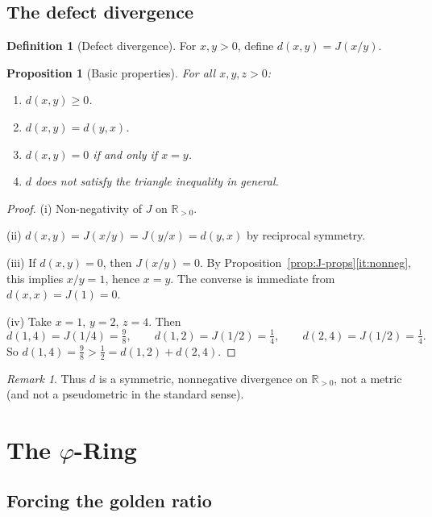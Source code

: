 \documentclass[11pt,a4paper]{article}
\theoremstyle{plain}
\newtheorem{proposition}[theorem]{Proposition}
\theoremstyle{definition}
\newtheorem{definition}[theorem]{Definition}
\theoremstyle{remark}
\newtheorem{remark}[theorem]{Remark}
\newcommand{\phig}{\varphi}
\newcommand{\Jcost}{J}
\newcommand{\RR}{\mathbb{R}}
\begin{document}
\subsection{The defect divergence}\label{ssec:metric}

\begin{definition}[Defect divergence]\label{def:defect-dist}
For $x,y>0$, define $d(x,y)=\Jcost(x/y)$.
\end{definition}

\begin{proposition}[Basic properties]\label{prop:metric}
For all $x,y,z>0$:
\begin{enumerate}[nosep,label=\textup{(\roman*)}]
\item $d(x,y)\ge0$.
\item $d(x,y)=d(y,x)$.
\item $d(x,y)=0$ if and only if $x=y$.
\item $d$ does not satisfy the triangle inequality in general.
\end{enumerate}
\end{proposition}

\begin{proof}
(i) Non-negativity of $\Jcost$ on $\RR_{>0}$.

(ii) $d(x,y)=\Jcost(x/y)=\Jcost(y/x)=d(y,x)$ by reciprocal symmetry.

(iii) If $d(x,y)=0$, then $\Jcost(x/y)=0$.
By Proposition~\ref{prop:J-props}\ref{it:nonneg}, this implies $x/y=1$,
hence $x=y$.  The converse is immediate from $d(x,x)=\Jcost(1)=0$.

(iv) Take $x=1$, $y=2$, $z=4$.  Then
\[
  d(1,4)=\Jcost(1/4)=\tfrac{9}{8},\qquad
  d(1,2)=\Jcost(1/2)=\tfrac14,\qquad
  d(2,4)=\Jcost(1/2)=\tfrac14.
\]
So $d(1,4)=\tfrac98>\tfrac12=d(1,2)+d(2,4)$.
\end{proof}

\begin{remark}
Thus $d$ is a symmetric, nonnegative divergence on $\RR_{>0}$, not a
metric (and not a pseudometric in the standard sense).
\end{remark}


\section{The $\phig$-Ring}\label{sec:phi}

\subsection{Forcing the golden ratio}
\end{document}
